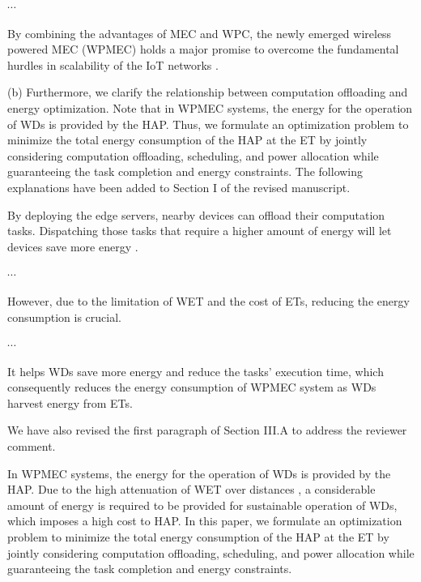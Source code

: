 \documentclass[12pt,draftclsnofoot,onecolumn]{IEEEtran}
\newcommand{\rev}[1]{{\color{blue}#1}} %
\newcommand{\rev}[1]{#1}
\newenvironment{my}[2]%
{\begin{list}{}%
{\setlength{\rightmargin}{#1}\setlength{\leftmargin}{#2}}%


 \item[]{}

} {\end{list}}
\begin{document}
\begin{enumerate}
\begin{my}{1cm}{1cm}
{	$\cdots$
	
By combining the advantages of MEC and WPC, the newly emerged wireless powered MEC (WPMEC) holds a major promise to overcome the fundamental hurdles in scalability of the IoT networks \cite{b9,b10,b30,b33}.}\newline
	
\end{my}

(b) Furthermore, we clarify the relationship between computation offloading and energy optimization. Note that in WPMEC systems, the energy for the operation of WDs is provided by the HAP. Thus, we formulate an optimization problem to minimize the total energy consumption of the HAP at the ET by jointly considering computation offloading, scheduling, and power allocation while guaranteeing the task completion and energy constraints. The following explanations have been added to Section I of the revised manuscript. \\

\begin{my}{1cm}{1cm}
	\rev{ 
		By deploying the edge servers, nearby devices can offload their computation tasks. Dispatching those tasks that require a higher amount of energy will let devices save more energy \cite{b38}.
		
		$\cdots$
		
However, due to the limitation of WET and the cost of ETs, reducing the energy consumption is crucial.

$\cdots$		
		
It helps WDs save more energy and reduce the tasks' execution time, which consequently reduces the energy consumption of WPMEC system as WDs harvest energy from ETs.}\newline
	
\end{my}

We have also revised the first paragraph of Section III.A to address the reviewer comment. \\

\begin{my}{1cm}{1cm}
	\rev{In WPMEC systems, the energy for the operation of WDs is provided by the HAP.  Due to the high attenuation of WET over distances \cite{b8}, a considerable amount of energy is required to be provided for sustainable operation of WDs, which imposes a high cost to HAP. In this paper, we formulate an optimization problem to minimize the total energy consumption of the HAP at the ET by jointly considering computation offloading, scheduling, and power allocation while guaranteeing the task completion and energy constraints.} \newline
\end{my} 


\end{enumerate}
\end{document}
